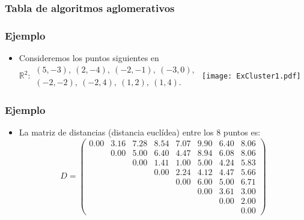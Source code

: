 \begin{frame}
\frametitle{Tabla de algoritmos aglomerativos}
\end{frame}
\begin{frame}
\frametitle{Ejemplo}
\begin{itemize}
\item<2->{Consideremos los puntos siguientes en $\mathbb{R}^2: 
\begin{array}{l}
(5,-3),\ (2,-4),\ (-2,-1),\ (-3,0),\\ (-2,-2),\ (-2,4),\ (1,2),\ (1,4).\end{array}$
\vskip 0.05cm
\texttt{[image: ExCluster1.pdf]}}
\end{itemize}
\end{frame}
\begin{frame}
\frametitle{Ejemplo}
\begin{itemize}
\item<2->{La matriz de distancias (distancia euclídea) entre los $8$ puntos es:
$$
D= \begin{pmatrix}
0.00&3.16&7.28&8.54&7.07&9.90&6.40&8.06 \\
&0.00&5.00&6.40&4.47&8.94&6.08&8.06\\
&&0.00&1.41&1.00&5.00&4.24&5.83\\
&&&0.00&2.24&4.12&4.47&5.66\\
&&&&0.00&6.00&5.00&6.71\\
&&&&&0.00&3.61&3.00\\
&&&&&&0.00&2.00\\
&&&&&&&0.00
\end{pmatrix}
$$}
\end{itemize}
\end{frame}
